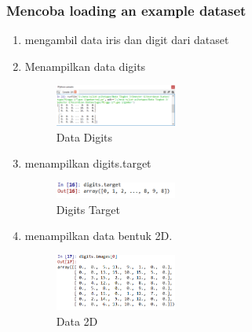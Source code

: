             \subsubsection{Mencoba loading an example dataset}
            \begin{enumerate}
                \item mengambil data iris dan digit dari dataset \hfill \break 
                
                \item Menampilkan data digits \hfill \break 
                
                \begin{figure}[H]
                    \includegraphics[width=4cm]{figures/1174039/chapter1/3.png}
                    \centering
                    \caption{Data Digits}
                \end{figure}

                \item menampilkan digits.target
                \hfill \break 

                \begin{figure}[H]
                    \includegraphics[width=4cm]{figures/1174039/chapter1/4.png}
                    \centering
                    \caption{Digits Target}
                \end{figure}

                \item menampilkan data bentuk 2D. \hfill \break 

                \begin{figure}[H]
                    \includegraphics[width=4cm]{figures/1174039/chapter1/5.png}
                    \centering
                    \caption{Data 2D}
                \end{figure}
            \end{enumerate}


